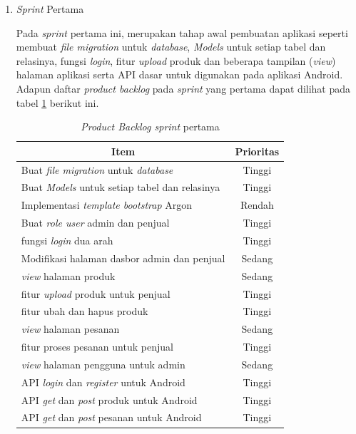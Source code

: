 \newpage
\begin{enumerate}
	\item \textit{Sprint} Pertama
	\par Pada \textit{sprint} pertama ini, merupakan tahap awal pembuatan aplikasi seperti membuat \textit{file migration} untuk \textit{database}, \textit{Models} untuk setiap tabel dan relasinya, fungsi \textit{login}, fitur \textit{upload} produk dan beberapa tampilan (\textit{view}) halaman aplikasi serta API dasar untuk digunakan pada aplikasi Android. Adapun daftar \textit{product backlog} pada \textit{sprint} yang pertama dapat dilihat pada tabel \ref*{tab:sprint pertama} berikut ini.


	\addtocounter{table}{+1}
	\begin{table}[H]
		\begin{center}
		\caption{\textit{Product Backlog sprint} pertama}
		\label{tab:sprint pertama}
		\begin{tabular}{|l|c|}
		\hline
		\multicolumn{1}{|c|}{Item} & Prioritas\\
		\hline
		Buat \textit{file migration} untuk \textit{database} & Tinggi\\
		\hline
		Buat \textit{Models} untuk setiap tabel dan relasinya & Tinggi\\
		\hline
		Implementasi \textit{template bootstrap} Argon & Rendah\\
		\hline
		Buat \textit{role user} admin dan penjual & Tinggi\\
		\hline
		fungsi \textit{login} dua arah & Tinggi\\
		\hline
		Modifikasi halaman dasbor admin dan penjual & Sedang\\
		\hline
		\textit{view} halaman produk & Sedang\\
		\hline
		fitur \textit{upload} produk untuk penjual& Tinggi\\
		\hline
		fitur ubah dan hapus produk & Tinggi\\
		\hline
		\textit{view} halaman pesanan & Sedang\\
		\hline
		fitur proses pesanan untuk penjual & Tinggi\\
		\hline
		\textit{view} halaman pengguna untuk admin & Sedang\\
		\hline
		API \textit{login} dan \textit{register} untuk Android & Tinggi\\
		\hline
		API \textit{get} dan \textit{post} produk untuk Android & Tinggi\\
		\hline
		API \textit{get} dan \textit{post} pesanan untuk Android & Tinggi\\
		\hline
		\end{tabular}
		\end{center}
	\end{table}


\end{enumerate}
